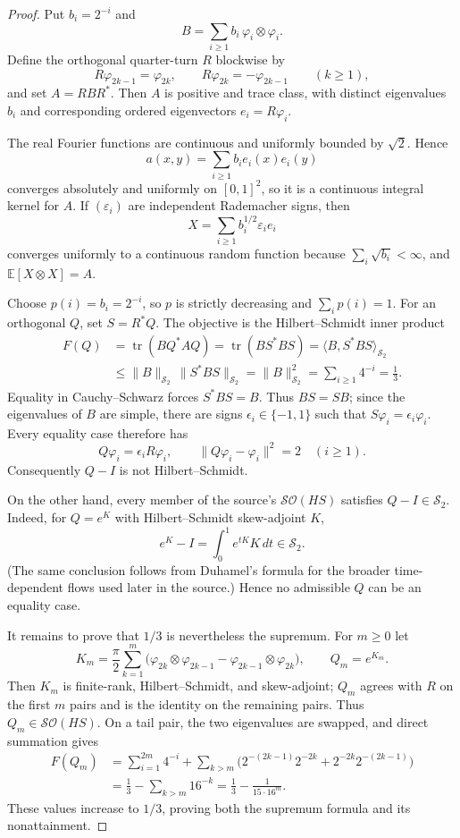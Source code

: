 \documentclass[11pt]{article}
\newcommand{\HS}{\mathcal S_2}
\newcommand{\tr}{\operatorname{tr}}
\begin{document}
\begin{proof}
Put $b_i=2^{-i}$ and
\[
 B=\sum_{i\geq1}b_i\,\varphi_i\otimes\varphi_i.
\]
Define the orthogonal quarter-turn $R$ blockwise by
\[
 R\varphi_{2k-1}=\varphi_{2k},\qquad
 R\varphi_{2k}=-\varphi_{2k-1}\qquad(k\geq1),
\]
and set $A=RBR^*$.  Then $A$ is positive and trace class, with distinct
eigenvalues $b_i$ and corresponding ordered eigenvectors
$e_i=R\varphi_i$.

The real Fourier functions are continuous and uniformly bounded by
$\sqrt2$.  Hence
\[
 a(x,y)=\sum_{i\geq1}b_i e_i(x)e_i(y)
\]
converges absolutely and uniformly on $[0,1]^2$, so it is a continuous
integral kernel for $A$.  If $(\varepsilon_i)$ are independent Rademacher
signs, then
\[
 X=\sum_{i\geq1}b_i^{1/2}\varepsilon_i e_i
\]
converges uniformly to a continuous random function because
$\sum_i\sqrt{b_i}<\infty$, and $\mathbb E[X\otimes X]=A$.

Choose $p(i)=b_i=2^{-i}$, so $p$ is strictly decreasing and
$\sum_i p(i)=1$.  For an orthogonal $Q$, set $S=R^*Q$.  The objective is
the Hilbert--Schmidt inner product
\begin{align*}
 F(Q)
 &=\tr(BQ^*AQ)
   =\tr(BS^*BS)
   =\langle B,S^*BS\rangle_{\HS}\\
 &\leq \|B\|_{\HS}\,\|S^*BS\|_{\HS}
   =\|B\|_{\HS}^2
   =\sum_{i\geq1}4^{-i}=\frac13.
\end{align*}
Equality in Cauchy--Schwarz forces $S^*BS=B$.  Thus $BS=SB$; since the
eigenvalues of $B$ are simple, there are signs $\epsilon_i\in\{-1,1\}$
such that $S\varphi_i=\epsilon_i\varphi_i$.  Every equality case therefore
has
\[
 Q\varphi_i=\epsilon_i R\varphi_i,
 \qquad
 \|Q\varphi_i-\varphi_i\|^2=2
 \quad(i\geq1).
\]
Consequently $Q-I$ is not Hilbert--Schmidt.

On the other hand, every member of the source's $\mathcal{SO}(HS)$ satisfies
$Q-I\in\HS$.  Indeed, for $Q=e^K$ with Hilbert--Schmidt skew-adjoint $K$,
\[
 e^K-I=\int_0^1 e^{tK}K\,dt\in\HS.
\]
(The same conclusion follows from Duhamel's formula for the broader
time-dependent flows used later in the source.)  Hence no admissible $Q$ can
be an equality case.

It remains to prove that $1/3$ is nevertheless the supremum.  For $m\geq0$
let
\[
 K_m=\frac\pi2\sum_{k=1}^{m}
 \bigl(\varphi_{2k}\otimes\varphi_{2k-1}
       -\varphi_{2k-1}\otimes\varphi_{2k}\bigr),
 \qquad Q_m=e^{K_m}.
\]
Then $K_m$ is finite-rank, Hilbert--Schmidt, and skew-adjoint; $Q_m$ agrees
with $R$ on the first $m$ pairs and is the identity on the remaining pairs.
Thus $Q_m\in\mathcal{SO}(HS)$.  On a tail pair, the two eigenvalues are
swapped, and direct summation gives
\begin{align*}
 F(Q_m)
 &=\sum_{i=1}^{2m}4^{-i}
   +\sum_{k>m}
     \bigl(2^{-(2k-1)}2^{-2k}
          +2^{-2k}2^{-(2k-1)}\bigr)\\
 &=\frac13-\sum_{k>m}16^{-k}
  =\frac13-\frac{1}{15\cdot16^m}.
\end{align*}
These values increase to $1/3$, proving both the supremum formula and its
nonattainment.
\end{proof}
\end{document}
